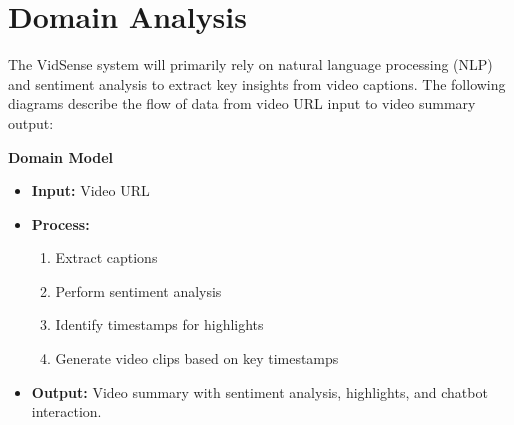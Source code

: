 \documentclass{bscs}
\begin{document}
\chapter{Domain Analysis}

The VidSense system will primarily rely on natural language processing (NLP) and sentiment analysis to extract key insights from video captions. The following diagrams describe the flow of data from video URL input to video summary output:
\\

\item \textbf{Domain Model}

\begin{itemize}
        \item \textbf {Input:} Video URL 
        \item \textbf {Process:} 
        \begin{enumerate}
        \item {Extract captions}
        \item {Perform sentiment analysis}
        \item {Identify timestamps for highlights}
        \item {Generate video clips based on key timestamps}

        \end{enumerate}
        \item \textbf {Output:} Video summary with sentiment analysis, highlights, and chatbot interaction.
        
    \end{itemize}
\end{document}
